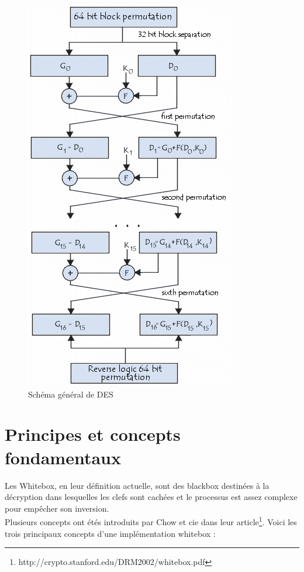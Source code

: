 \documentclass[a4paper,12pt]{article}
\begin{document}
\clearpage

\begin{figure}[h]
\centering
\includegraphics[scale=0.80]{./images/DES_diagram.png}
\caption{Schéma général de DES}
\label{fig:DES-diagram}
\end{figure}

\clearpage

\section{Principes et concepts fondamentaux}

Les Whitebox, en leur définition actuelle, sont des blackbox destinées à la décryption dans lesquelles les clefs sont cachées et le processus est assez complexe pour empêcher son inversion.\\
Plusieurs concepts ont étés introduits par Chow et cie dans leur article\footnote{http://crypto.stanford.edu/DRM2002/whitebox.pdf}. Voici les trois principaux concepts d'une implémentation whitebox :
\end{document}
